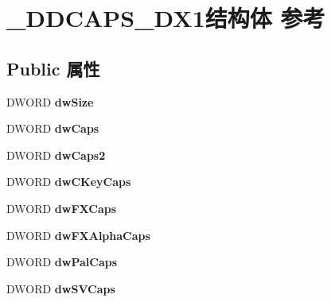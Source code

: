 \hypertarget{struct___d_d_c_a_p_s___d_x1}{}\section{\+\_\+\+D\+D\+C\+A\+P\+S\+\_\+\+D\+X1结构体 参考}
\label{struct___d_d_c_a_p_s___d_x1}
\subsection*{Public 属性}
\begin{DoxyCompactItemize}
\item 
\mbox{\label{struct___d_d_c_a_p_s___d_x1_ab76c2e414b57af16f1113116d6d8c771}} 
D\+W\+O\+RD {\bfseries dw\+Size}
\item 
\mbox{\label{struct___d_d_c_a_p_s___d_x1_af31c0d54fedd5dfd3bd43e5ca9c9e137}} 
D\+W\+O\+RD {\bfseries dw\+Caps}
\item 
\mbox{\label{struct___d_d_c_a_p_s___d_x1_a4b8b1bd5abc9071cd2ac1403cf8eaa24}} 
D\+W\+O\+RD {\bfseries dw\+Caps2}
\item 
\mbox{\label{struct___d_d_c_a_p_s___d_x1_afe17ca317c877af6ef693724ba1d682f}} 
D\+W\+O\+RD {\bfseries dw\+C\+Key\+Caps}
\item 
\mbox{\label{struct___d_d_c_a_p_s___d_x1_a625554dacf26d62cae5f183ae87ff74a}} 
D\+W\+O\+RD {\bfseries dw\+F\+X\+Caps}
\item 
\mbox{\label{struct___d_d_c_a_p_s___d_x1_ad519219348c80371a26ae90d787f347b}} 
D\+W\+O\+RD {\bfseries dw\+F\+X\+Alpha\+Caps}
\item 
\mbox{\label{struct___d_d_c_a_p_s___d_x1_a78f38130ed2d5038f2bc69cb65735384}} 
D\+W\+O\+RD {\bfseries dw\+Pal\+Caps}
\item 
\mbox{\label{struct___d_d_c_a_p_s___d_x1_abdf5178568bd2af8a8d5cd5ef7528eab}} 
D\+W\+O\+RD {\bfseries dw\+S\+V\+Caps}
\item 
\mbox{\label{struct___d_d_c_a_p_s___d_x1_ac6e61be879230f0131897006f39b4ba0}} 

\end{DoxyCompactItemize}
